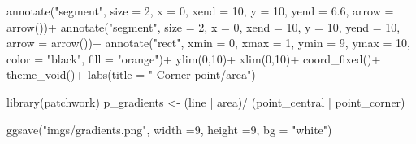 \documentclass[
  letterpaper,
  DIV=11,
  numbers=noendperiod]{scrreprt}
\newenvironment{Shaded}{\begin{snugshade}}{\end{snugshade}}
\newcommand{\AttributeTok}[1]{\textcolor[rgb]{0.40,0.45,0.13}{#1}}
\newcommand{\DecValTok}[1]{\textcolor[rgb]{0.68,0.00,0.00}{#1}}
\newcommand{\FloatTok}[1]{\textcolor[rgb]{0.68,0.00,0.00}{#1}}
\newcommand{\FunctionTok}[1]{\textcolor[rgb]{0.28,0.35,0.67}{#1}}
\newcommand{\NormalTok}[1]{\textcolor[rgb]{0.00,0.23,0.31}{#1}}
\newcommand{\OtherTok}[1]{\textcolor[rgb]{0.00,0.23,0.31}{#1}}
\newcommand{\SpecialCharTok}[1]{\textcolor[rgb]{0.37,0.37,0.37}{#1}}
\newcommand{\StringTok}[1]{\textcolor[rgb]{0.13,0.47,0.30}{#1}}
\begin{document}
\begin{Shaded}
\begin{Highlighting}[]
  \FunctionTok{annotate}\NormalTok{(}\StringTok{"segment"}\NormalTok{, }\AttributeTok{size =} \DecValTok{2}\NormalTok{, }\AttributeTok{x =} \DecValTok{0}\NormalTok{, }\AttributeTok{xend =} \DecValTok{10}\NormalTok{, }\AttributeTok{y =} \DecValTok{10}\NormalTok{, }\AttributeTok{yend =} \FloatTok{6.6}\NormalTok{, }\AttributeTok{arrow =} \FunctionTok{arrow}\NormalTok{())}\SpecialCharTok{+}
  \FunctionTok{annotate}\NormalTok{(}\StringTok{"segment"}\NormalTok{, }\AttributeTok{size =} \DecValTok{2}\NormalTok{, }\AttributeTok{x =} \DecValTok{0}\NormalTok{, }\AttributeTok{xend =} \DecValTok{10}\NormalTok{, }\AttributeTok{y =} \DecValTok{10}\NormalTok{, }\AttributeTok{yend =} \DecValTok{10}\NormalTok{, }\AttributeTok{arrow =} \FunctionTok{arrow}\NormalTok{())}\SpecialCharTok{+}
  \FunctionTok{annotate}\NormalTok{(}\StringTok{"rect"}\NormalTok{, }\AttributeTok{xmin =} \DecValTok{0}\NormalTok{, }\AttributeTok{xmax =} \DecValTok{1}\NormalTok{, }\AttributeTok{ymin =} \DecValTok{9}\NormalTok{, }\AttributeTok{ymax =} \DecValTok{10}\NormalTok{, }\AttributeTok{color =} \StringTok{"black"}\NormalTok{, }\AttributeTok{fill =} \StringTok{"orange"}\NormalTok{)}\SpecialCharTok{+}
  \FunctionTok{ylim}\NormalTok{(}\DecValTok{0}\NormalTok{,}\DecValTok{10}\NormalTok{)}\SpecialCharTok{+}
  \FunctionTok{xlim}\NormalTok{(}\DecValTok{0}\NormalTok{,}\DecValTok{10}\NormalTok{)}\SpecialCharTok{+}
  \FunctionTok{coord\_fixed}\NormalTok{()}\SpecialCharTok{+}
  \FunctionTok{theme\_void}\NormalTok{()}\SpecialCharTok{+}
  \FunctionTok{labs}\NormalTok{(}\AttributeTok{title =} \StringTok{"    Corner point/area"}\NormalTok{)}

\FunctionTok{library}\NormalTok{(patchwork)}
\NormalTok{p\_gradients }\OtherTok{\textless{}{-}}\NormalTok{ (line }\SpecialCharTok{|}\NormalTok{ area)}\SpecialCharTok{/}
\NormalTok{(point\_central }\SpecialCharTok{|}\NormalTok{ point\_corner)}

\FunctionTok{ggsave}\NormalTok{(}\StringTok{"imgs/gradients.png"}\NormalTok{, }\AttributeTok{width =}\DecValTok{9}\NormalTok{, }\AttributeTok{height =}\DecValTok{9}\NormalTok{, }\AttributeTok{bg =} \StringTok{"white"}\NormalTok{)}
\end{Highlighting}
\end{Shaded}
\end{document}
